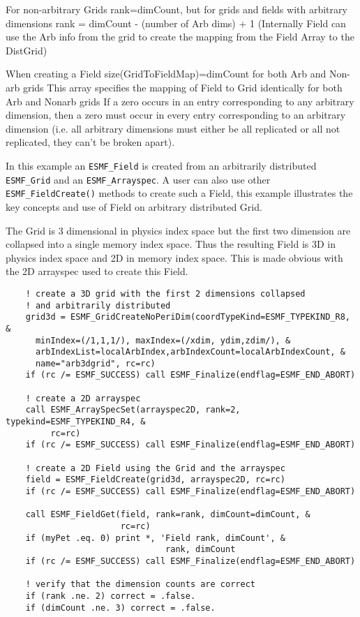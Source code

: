     For non-arbitrary Grids rank=dimCount, but for grids and fields with
    arbitrary dimensions rank = dimCount - (number of Arb dims) + 1
    (Internally Field can use the Arb info from the grid to create the mapping
    from the Field Array to the DistGrid)
  
    When creating a Field size(GridToFieldMap)=dimCount for both Arb and Non-arb grids
    This array specifies the mapping of Field to Grid identically for both Arb and Nonarb grids 
    If a zero occurs in an entry corresponding to any arbitrary dimension, then
    a zero must occur in every entry corresponding to an arbitrary dimension (i.e.
    all arbitrary dimensions must either be all replicated or all not replicated,
    they can't be broken apart).
  
    In this example an {\tt ESMF\_Field} is created from an arbitrarily distributed {\tt ESMF\_Grid} and 
    an {\tt ESMF\_Arrayspec}. A user can also use other {\tt ESMF\_FieldCreate()} methods to create 
    such a Field, this example illustrates the key concepts and use of Field on arbitrary distributed Grid.
    
    The Grid is 3 dimensional in physics index space but the first two dimension are collapsed into
    a single memory index space. Thus the resulting Field is 3D in physics index space and 2D in memory index
    space. This is made obvious with the 2D arrayspec used to create this Field.
   

 \begin{verbatim}
    ! create a 3D grid with the first 2 dimensions collapsed 
    ! and arbitrarily distributed
    grid3d = ESMF_GridCreateNoPeriDim(coordTypeKind=ESMF_TYPEKIND_R8, &
      minIndex=(/1,1,1/), maxIndex=(/xdim, ydim,zdim/), &
      arbIndexList=localArbIndex,arbIndexCount=localArbIndexCount, &
      name="arb3dgrid", rc=rc)
    if (rc /= ESMF_SUCCESS) call ESMF_Finalize(endflag=ESMF_END_ABORT)

    ! create a 2D arrayspec
    call ESMF_ArraySpecSet(arrayspec2D, rank=2, typekind=ESMF_TYPEKIND_R4, &
         rc=rc)
    if (rc /= ESMF_SUCCESS) call ESMF_Finalize(endflag=ESMF_END_ABORT)

    ! create a 2D Field using the Grid and the arrayspec
    field = ESMF_FieldCreate(grid3d, arrayspec2D, rc=rc)
    if (rc /= ESMF_SUCCESS) call ESMF_Finalize(endflag=ESMF_END_ABORT)
  
    call ESMF_FieldGet(field, rank=rank, dimCount=dimCount, &
                       rc=rc)
    if (myPet .eq. 0) print *, 'Field rank, dimCount', &
                                rank, dimCount
    if (rc /= ESMF_SUCCESS) call ESMF_Finalize(endflag=ESMF_END_ABORT)
  
    ! verify that the dimension counts are correct
    if (rank .ne. 2) correct = .false.
    if (dimCount .ne. 3) correct = .false.  
 
\end{verbatim}
 

